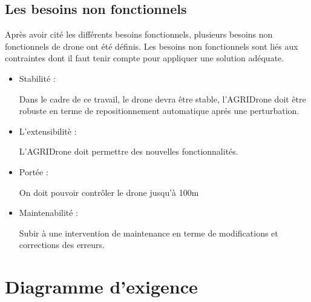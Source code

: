 	\subsection{Les besoins non fonctionnels}
	Après avoir cité les différents besoins fonctionnels, plusieurs besoins non fonctionnels de drone ont été définis.
	Les besoins non fonctionnels sont liés aux contraintes dont il faut tenir compte pour appliquer une solution adéquate.
	\begin{itemize}
		\item Stabilité :
		
		
		Dans le cadre de ce travail, le drone devra être stable, l'AGRIDrone doit être robuste en terme de repositionnement automatique aprés une perturbation.	
		
		\item L'extensibilitè : 
		
		
		L’AGRIDrone doit permettre des nouvelles fonctionnalités.
		
		\item Portée : 
		
		
		On doit pouvoir contrôler le drone jusqu'à 100m
		
		
		\item Maintenabilité :
		
		
		Subir à une intervention de maintenance en terme de modifications et corrections des erreurs.
		\end{itemize}
		
	
		
	
\newpage
	\section{Diagramme d’exigence }

